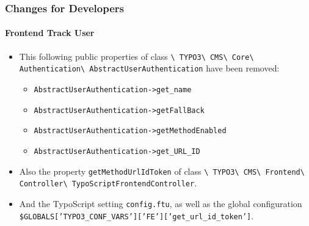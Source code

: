 
\begin{frame}[fragile]
	\frametitle{Changes for Developers}
	\framesubtitle{Frontend Track User}

	\begin{itemize}

		\item This following public properties of class\newline
			\smaller\texttt{\textbackslash
				TYPO3\textbackslash
				CMS\textbackslash
				Core\textbackslash
				Authentication\textbackslash
				AbstractUserAuthentication}
			\normalsize\newline
			have been removed:

			\begin{itemize}\smaller
				\item \texttt{AbstractUserAuthentication->get\_name}
				\item \texttt{AbstractUserAuthentication->getFallBack}
				\item \texttt{AbstractUserAuthentication->getMethodEnabled}
				\item \texttt{AbstractUserAuthentication->get\_URL\_ID}
			\end{itemize}\normalsize

		\item Also the property \texttt{getMethodUrlIdToken} of class\newline
			\smaller\texttt{\textbackslash
				TYPO3\textbackslash
				CMS\textbackslash
				Frontend\textbackslash
				Controller\textbackslash
				TypoScriptFrontendController}.
			\normalsize

		\item And the TypoScript setting \texttt{config.ftu},
			as well as the global configuration
			{\fontsize{8}{8} \selectfont \texttt{\$GLOBALS['TYPO3\_CONF\_VARS']['FE']['get\_url\_id\_token']}.}

	\end{itemize}

\end{frame}


